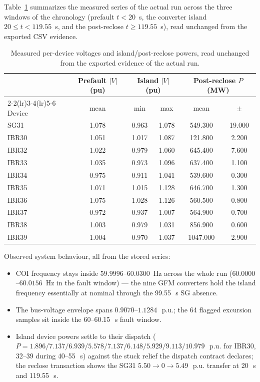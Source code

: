 \documentclass[12pt,a4paper]{article}
\newcommand{\pu}{\ifmmode\,\mathrm{p.u.}\else\ p.u.\fi}
\newcommand{\second}{\ifmmode\,\mathrm{s}\else\ s\fi}
\begin{document}
Table~\ref{tab:tsstats} summarizes the measured series of the actual run
across the three windows of the chronology (prefault $t<20$~s, the
converter island $20\le t<119.55$~s, and the post-reclose
$t\ge119.55$~s), read unchanged from the exported CSV evidence.

\begin{table}[H]\centering\footnotesize
\caption{Measured per-device voltages and island/post-reclose powers, read
unchanged from the exported evidence of the actual run.}
\label{tab:tsstats}
\begin{tabular}{lccccc}
\toprule
& \multicolumn{1}{c}{Prefault $|V|$ (pu)} &
\multicolumn{2}{c}{Island $|V|$ (pu)} &
\multicolumn{2}{c}{Post-reclose $P$ (MW)}\\
\cmidrule(lr){2-2}\cmidrule(lr){3-4}\cmidrule(lr){5-6}
Device & mean & min & max & mean & $\pm$\\
\midrule
SG31   & 1.078 & 0.963 & 1.078 & 549.300 & 19.000\\
IBR30  & 1.051 & 1.017 & 1.087 & 121.800 & 2.200\\
IBR32  & 1.022 & 0.979 & 1.060 & 645.400 & 7.600\\
IBR33  & 1.035 & 0.973 & 1.096 & 637.400 & 1.100\\
IBR34  & 0.975 & 0.911 & 1.041 & 539.600 & 0.300\\
IBR35  & 1.071 & 1.015 & 1.128 & 646.700 & 1.300\\
IBR36  & 1.075 & 1.028 & 1.126 & 560.500 & 0.800\\
IBR37  & 0.972 & 0.937 & 1.007 & 564.900 & 0.700\\
IBR38  & 1.003 & 0.979 & 1.031 & 856.900 & 0.600\\
IBR39  & 1.004 & 0.970 & 1.037 & 1047.000 & 2.900\\
\bottomrule
\end{tabular}
\end{table}

Observed system behaviour, all from the stored series:
\begin{itemize}
\item COI frequency stays inside $59.9996$--$60.0300$~Hz across the whole
      run ($60.0000$--$60.0156$~Hz in the fault window) --- the nine GFM
      converters hold the island frequency essentially at nominal through
      the 99.55\second{} SG absence.
\item The bus-voltage envelope spans $0.9070$--$1.1284$\pu; the 64 flagged
      excursion samples sit inside the 60--60.15\second{} fault window.
\item Island device powers settle to their dispatch
      ($P=1.896/7.137/6.939/5.578/7.137/6.148/5.929/9.113/10.979$\pu{}
      for IBR30, 32--39 during 40--55\second) against the stuck relief the
      dispatch contract declares; the reclose transaction shows the SG31
      $5.50\to0\to5.49$\pu{} transfer at 20\second{} and 119.55\second.
\end{itemize}
\end{document}
